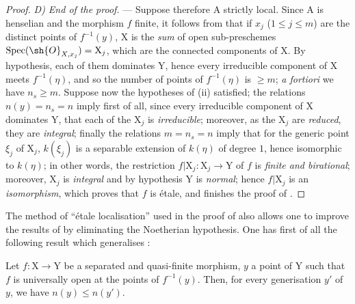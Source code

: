 \begin{proof}
\emph{D) End of the proof.} ---
Suppose therefore $\mathrm{A}$ strictly local.
Since $\mathrm{A}$ is henselian and the morphism $f$ finite, it follows from  that if $x_j$ ($1\leq j\leq m$) are the distinct points of $f^{-1}(y)$, $\mathrm{X}$ is the \emph{sum} of open sub-preschemes $\operatorname{Spec}(\sh{O}_{X,x_j})=\mathrm{X}_j$, which are the connected components of $\mathrm{X}$.
By hypothesis, each of them dominates $\mathrm{Y}$, hence every irreducible component of $\mathrm{X}$ meets $f^{-1}(\eta)$, and so the number of points of $f^{-1}(\eta)$ is $\geq m$; \emph{a fortiori} we have $n_s\geq m$.
Suppose now the hypotheses of (ii) satisfied; the relations $n(y)=n_s=n$ imply first of all, since every irreducible component of $\mathrm{X}$ dominates $\mathrm{Y}$, that each of the $\mathrm{X}_j$ is \emph{irreducible}; moreover, as the $\mathrm{X}_j$ are \emph{reduced}, they are \emph{integral}; finally the relations $m=n_s=n$ imply that for the generic point $\xi_j$ of $\mathrm{X}_j$, $k(\xi_j)$ is a separable extension of $k(\eta)$ of degree $1$, hence isomorphic to $k(\eta)$; in other words, the restriction $f|\mathrm{X}_j:\mathrm{X}_j\to\mathrm{Y}$ of $f$ is \emph{finite and birational}; moreover, $\mathrm{X}_j$ is \emph{integral} and by hypothesis $\mathrm{Y}$ is \emph{normal}; hence  $f|\mathrm{X}_j$ is an \emph{isomorphism}, which proves that $f$ is \'etale, and finishes the proof of .
\end{proof}

\begin{remark}[18.10.17]
\label{IV.18.10.17}
The method of ``\'etale localisation'' used in the proof of  also allows one to improve the results of  by eliminating the Noetherian hypothesis.
One has first of all the following result which generalises :
\end{remark}

\begin{env}[18.10.17.1]
\label{IV.18.10.17.1}
Let $f:\mathrm{X}\to\mathrm{Y}$ be a separated and quasi-finite morphism, $y$ a point of $\mathrm{Y}$ such that $f$ is universally open at the points of $f^{-1}(y)$.
Then, for every generisation $y'$ of $y$, we have $n(y)\leq n(y')$.
\end{env}


